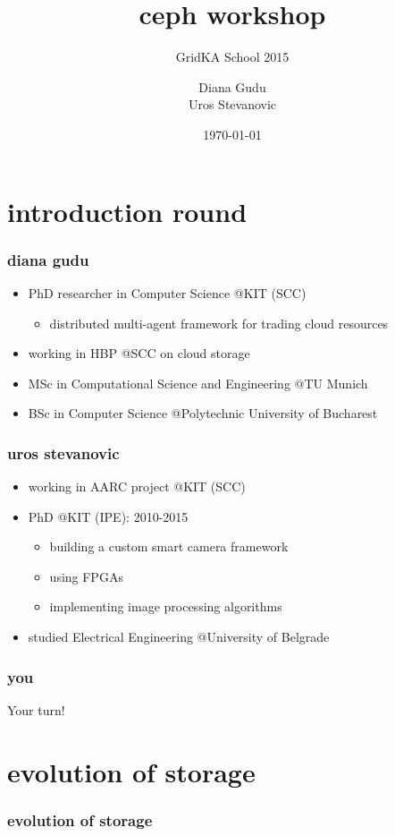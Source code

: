 \documentclass[10pt, compress]{beamer}
\title{ceph workshop}
\subtitle{GridKA School 2015}
\date{\today}
\author{Diana Gudu\\
        Uros Stevanovic}
\institute[KIT]{Karlsruhe Institute of Technology}
\begin{document}
\maketitle

\section{introduction round}
\begin{frame}
    \frametitle{diana gudu}
    \begin{itemize}
        \item PhD researcher in Computer Science @KIT (SCC)
            \begin{itemize}
                \item distributed multi-agent framework for trading cloud 
                    resources
            \end{itemize}
        \item working in HBP @SCC on cloud storage
        \item MSc in Computational Science and Engineering @TU Munich
        \item BSc in Computer Science @Polytechnic University of Bucharest
    \end{itemize}
\end{frame}

\begin{frame}
    \frametitle{uros stevanovic}
    \begin{itemize}
        \item working in AARC project @KIT (SCC)
        \item PhD @KIT (IPE): 2010-2015
            \begin{itemize}
            \item building a custom smart camera framework
            \item using FPGAs
            \item implementing image processing algorithms
            \end{itemize}
        \item studied Electrical Engineering @University of Belgrade
    \end{itemize}
\end{frame}

\begin{frame}
    \frametitle{you}
    \centering Your turn!
\end{frame}


\section{evolution of storage}
\begin{frame}[fragile]
  \frametitle{evolution of storage}
    \begin{center}
        
    \end{center}
\end{frame}
\end{document}
